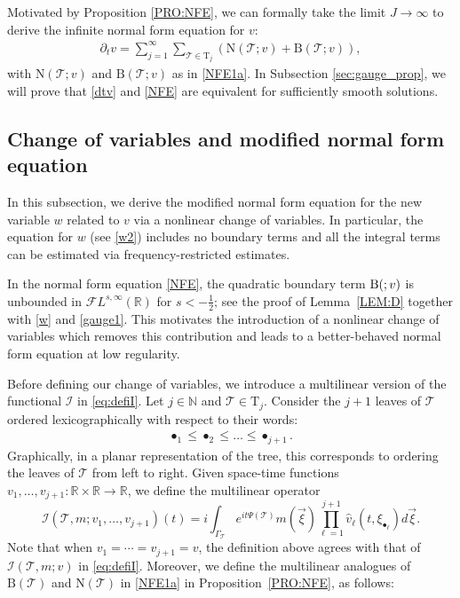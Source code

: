 \documentclass[a4paper,
11pt,  reqno]{amsart}
\makeatletter
\newcommand{\5}{\textup{V}}
\newcommand{\FL}{\mathcal{F} L}
\newcommand{\ft}{\widehat}
\newcommand{\dt}{\partial_t}
\theoremstyle{remark}
\newcommand{\R}{\mathbb{R}}
\newcommand{\bul}{\bullet}
\newcommand{\TT}{\mathcal{T}}
\newcommand{\Tr}{\mathrm{T}}
\renewcommand{\l}{\ell}
\newcommand{\N}{\mathbb{N}}
\def\<#1>{\csname MH@symb@#1\endcsname}
\newcommand{\Ical}{\mathcal{I}}
\numberwithin{equation}{section}
\numberwithin{theorem}{section}
\newcommand{\NN}{\mathrm{N}}
\newcommand{\BB}{\mathrm{B}}
\makeatother
\begin{document}
Motivated by Proposition \ref{PRO:NFE}, we can formally take the limit $J\to \infty$ to derive the infinite normal form equation for $v$:
\begin{align}
\label{NFE}
\dt v= \sum_{j=1}^{\infty} \sum_{\TT\in \Tr_j} \left(\NN(\TT;v) +
\BB(\TT;v) \right)
,
\end{align}
with $\NN(\TT;v)$ and $\BB(\TT;v)$ as in \eqref{NFE1a}.
In Subsection \ref{sec:gauge_prop}, we will prove that \eqref{dtv} and \eqref{NFE} are equivalent for sufficiently smooth solutions.

\subsection{Change of variables and modified normal form equation}
\label{SUBSEC:gauge}

In this subsection, we derive the modified normal form equation for the new variable $w$ related to $v$ via a nonlinear change of variables. In particular, the equation for $w$ (see \eqref{w2}) includes no boundary terms and all the integral terms can be estimated via frequency-restricted estimates.



In the normal form equation \eqref{NFE}, the quadratic boundary term $\BB(\<1>;v)$ is unbounded in $\FL^{s,\infty}(\R)$ for $s<-\frac12$; see the proof of Lemma~\ref{LEM:D} together with \eqref{w} and \eqref{gauge1}. This motivates the introduction of a nonlinear change of variables which removes this contribution and leads to a better-behaved normal form equation at low regularity.

Before defining our change of variables, we introduce a multilinear version of the functional $\Ical$ in \eqref{eq:defiI}.
Let $j\in \N$ and $\TT\in \Tr_j$. Consider the $j+1$ leaves of $\TT$ ordered lexicographically with respect to their words:
\begin{align}
\label{lexic}
\bul_1\le \bul_2\le \dots \le \bul_{j+1}.
\end{align}
Graphically, in a
planar representation of the tree, this corresponds to ordering the leaves of
$\TT$ from left to right. Given space-time functions $v_1,\dots, v_{j+1}: \R \times \R \to \R$, we
define the multilinear operator
\begin{equation}\label{eq:defiImulti}
\Ical(\TT, m; v_1,\dots,v_{j+1}) (t)=i
\int_{\Gamma_\TT}
e^{it\Psi(\TT)}m(\vec{\xi}) \prod_{\ell
=1}^{j+1} \ft v_\l (t,\xi_{\bul_\ell}) d\vec{\xi}
.
\end{equation}
Note that
when $v_1 = \cdots = v_{j+1} = v$, the definition above agrees with that of $\Ical(\TT, m; v )$ in \eqref{eq:defiI}.  Moreover, we define the multilinear analogues of $\BB(\TT)$ and $\NN(\TT)$ in \eqref{NFE1a} in Proposition~\ref{PRO:NFE}, as follows:
\end{document}
